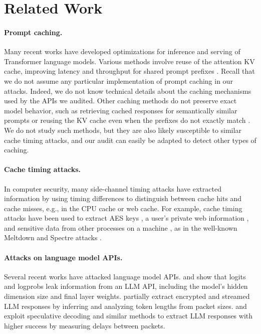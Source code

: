\section{Related Work}

\paragraph{Prompt caching.}
Many recent works have developed optimizations for inference and serving of Transformer language models. Various methods involve reuse of the attention KV cache, improving latency and throughput for shared prompt prefixes \citep{kwon2023efficient,zheng2024sglang,gim2024prompt,ye-etal-2024-chunkattention,cascade-inference,qin2024mooncake,juravsky2024hydragen}. Recall that we do not assume any particular implementation of prompt caching in our attacks. Indeed, we do not know technical details about the caching mechanisms used by the APIs we audited. Other caching methods do not preserve exact model behavior, such as retrieving cached responses for semantically similar prompts \citep{bang-2023-gptcache} or reusing the KV cache even when the prefixes do not exactly match \citep{gim2024prompt,yao2024cacheblend,hu2024epic}. We do not study such methods, but they are also likely susceptible to similar cache timing attacks, and our audit can easily be adapted to detect other types of caching.

\paragraph{Cache timing attacks.}
In computer security, many side-channel timing attacks have extracted information by using timing differences to distinguish between cache hits and cache misses, e.g., in the CPU cache or web cache. For example, cache timing attacks have been used to extract AES keys \citep{bernstein2005cache,osvik2006cache,bonneau2006cache,tromer2010efficient,gullasch2011cache,yarom2017cachebleed}, a user's private web information \citep{felten2000timing,bortz2007exposing,van2015clock}, and sensitive data from other processes on a machine \citep{percival2005cache,yarom2014flush,liu2015last}, as in the well-known Meltdown \citep{lipp2018meltdown} and Spectre attacks \citep{kocher2018spectre}.

\paragraph{Attacks on language model APIs.}
Several recent works have attacked language model APIs. \citet{carlini2024stealing} and \citet{finlayson2024logits} show that logits and logprobs leak information from an LLM API, including the model's hidden dimension size and final layer weights. \citet{weiss2024your} partially extract encrypted and streamed LLM responses by inferring and analyzing token lengths from packet sizes. \citet{carlini2024remote} and \citet{wei2024privacy} exploit speculative decoding \citep{leviathan2023fast,chen2023accelerating} and similar methods to extract LLM responses with higher success by measuring delays between packets.

